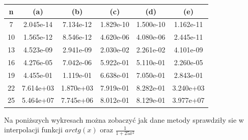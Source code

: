 \documentclass[11pt,wide]{article}
\begin{document}
\begin{center}
\begin{tabular}{|c|c|c|c|c|c|}
  \hline 
  n & (a) & (b) & (c) & (d) & (e) \\ \hline
  7 & 2.045e-14 & 7.134e-12 & 1.829e-10 & 1.500e-10 & 1.162e-11\\\hline
  10 & 1.565e-12 & 8.546e-12 & 4.620e-06 & 4.080e-06 & 2.445e-11\\\hline
  13 & 4.523e-09 & 2.941e-09 & 2.030e-02 & 2.261e-02 & 4.101e-09\\\hline
  16 & 4.276e-05 & 7.042e-06 & 5.922e-01 & 5.110e-01 & 2.260e-05\\\hline
  19 & 4.455e-01 & 1.119e-01 & 6.638e-01 & 7.050e-01 & 2.843e-01\\\hline
  22 & 7.614e+03 & 1.870e+03 & 7.919e-01 & 8.282e-01 & 3.240e+03\\\hline
  25 & 5.464e+07 & 7.745e+06 & 8.012e-01 & 8.129e-01 & 3.977e+07\\\hline
  
\end{tabular} 
\end{center}
\noindent
Na poniższych wykresach można zobaczyć jak dane metody sprawdziły sie w interpolacji funkcji $arctg(x)$ oraz $\frac{1}{1 + 25x^2}$ \newline
\noindent
\end{document}
